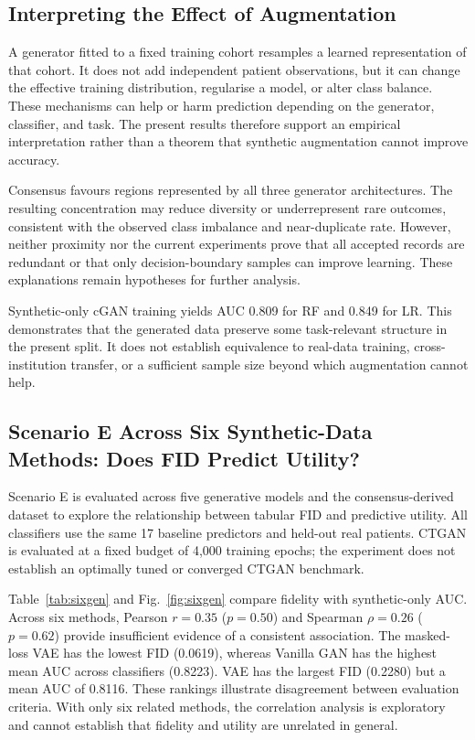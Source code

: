 \documentclass[journal]{IEEEtran}
\begin{document}
\subsection{Interpreting the Effect of Augmentation}
\label{sec:whynot}

A generator fitted to a fixed training cohort resamples a learned representation of that cohort. It does not add independent patient observations, but it can change the effective training distribution, regularise a model, or alter class balance. These mechanisms can help or harm prediction depending on the generator, classifier, and task. The present results therefore support an empirical interpretation rather than a theorem that synthetic augmentation cannot improve accuracy.

Consensus favours regions represented by all three generator architectures. The resulting concentration may reduce diversity or underrepresent rare outcomes, consistent with the observed class imbalance and near-duplicate rate. However, neither proximity nor the current experiments prove that all accepted records are redundant or that only decision-boundary samples can improve learning. These explanations remain hypotheses for further analysis.

Synthetic-only cGAN training yields AUC 0.809 for RF and 0.849 for LR. This demonstrates that the generated data preserve some task-relevant structure in the present split. It does not establish equivalence to real-data training, cross-institution transfer, or a sufficient sample size beyond which augmentation cannot help.

\subsection{Scenario E Across Six Synthetic-Data Methods: Does FID Predict Utility?}
\label{sec:sixgen}

Scenario E is evaluated across five generative models and the consensus-derived dataset to explore the relationship between tabular FID and predictive utility. All classifiers use the same 17 baseline predictors and held-out real patients. CTGAN is evaluated at a fixed budget of 4,000 training epochs; the experiment does not establish an optimally tuned or converged CTGAN benchmark.

Table~\ref{tab:sixgen} and Fig.~\ref{fig:sixgen} compare fidelity with synthetic-only AUC. Across six methods, Pearson $r=0.35$ ($p=0.50$) and Spearman $\rho=0.26$ ($p=0.62$) provide insufficient evidence of a consistent association. The masked-loss VAE has the lowest FID (0.0619), whereas Vanilla GAN has the highest mean AUC across classifiers (0.8223). VAE has the largest FID (0.2280) but a mean AUC of 0.8116. These rankings illustrate disagreement between evaluation criteria. With only six related methods, the correlation analysis is exploratory and cannot establish that fidelity and utility are unrelated in general.
\end{document}
